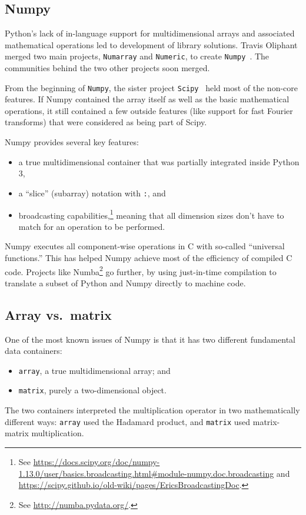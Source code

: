 \subsection{Numpy}
\label{S:Python:numpy}

Python's lack of in-language support for multidimensional arrays and
associated mathematical operations led to development of library
solutions.  Travis Oliphant merged two main projects,
\texttt{Numarray} and \texttt{Numeric}, to create
\texttt{Numpy}~\cite{oliphant2006numpy}. The communities behind the
two other projects soon merged.

From the beginning of \texttt{Numpy}, the sister project
\texttt{Scipy}~\cite{scipy2001} held most of the non-core features.
If Numpy contained the array itself as well as the basic mathematical
operations, it still contained a few outside features (like support
for fast Fourier transforms) that were considered as being part of
Scipy.

Numpy provides several key features:
\begin{itemize}
  \item a true multidimensional container that was partially integrated
   inside Python 3,
  \item a ``slice'' (subarray) notation with \texttt{:}, and
  \item broadcasting capabilities,\footnote{See
      \url{https://docs.scipy.org/doc/numpy-1.13.0/user/basics.broadcasting.html\#module-numpy.doc.broadcasting}
      and \url{https://scipy.github.io/old-wiki/pages/EricsBroadcastingDoc}.}
    meaning that all dimension sizes don't have to match for an
    operation to be performed.
\end{itemize}

Numpy executes all component-wise operations in C with so-called
``universal functions.''  This has helped Numpy achieve most of the
efficiency of compiled C code.  Projects like Numba\footnote{See
  \url{http://numba.pydata.org/}.} go further, by using just-in-time
compilation to translate a subset of Python and Numpy directly to
machine code.

\subsection{Array vs.\ matrix}
\label{S:Python:arraymatrix}

One of the most known issues of Numpy is that it has two different
fundamental data containers:
\begin{itemize}
\item \texttt{array}, a true multidimensional array; and
\item \texttt{matrix}, purely a two-dimensional object.
\end{itemize}
The two containers interpreted the multiplication operator in two
mathematically different ways: \texttt{array} used the Hadamard
product, and \texttt{matrix} used matrix-matrix multiplication.

